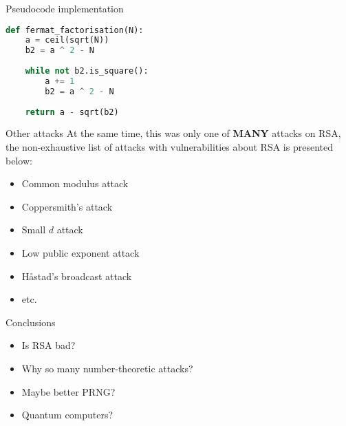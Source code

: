 \documentclass{beamer}
\begin{document}
\begin{frame}[fragile]{Pseudocode implementation}
    \begin{lstlisting}[language=Python]
def fermat_factorisation(N):
    a = ceil(sqrt(N))
    b2 = a ^ 2 - N
    
    while not b2.is_square():
        a += 1
        b2 = a ^ 2 - N
    
    return a - sqrt(b2)
    \end{lstlisting}
\end{frame}

\begin{frame}{Other attacks}
    At the same time, this was only one of \textbf{MANY} attacks on RSA, the 
    non-exhaustive list of attacks with vulnerabilities about RSA is presented 
    below:
    \begin{itemize}
        \item Common modulus attack
        \item Coppersmith's attack
        \item Small $d$ attack
        \item Low public exponent attack
        \item Håstad's broadcast attack
        \item etc.
    \end{itemize}
\end{frame}

\begin{frame}{Conclusions}
    \begin{itemize}
        \item Is RSA bad?
        \item Why so many number-theoretic attacks?
        \item Maybe better PRNG?
        \item Quantum computers?
    \end{itemize}
\end{frame}
\end{document}
